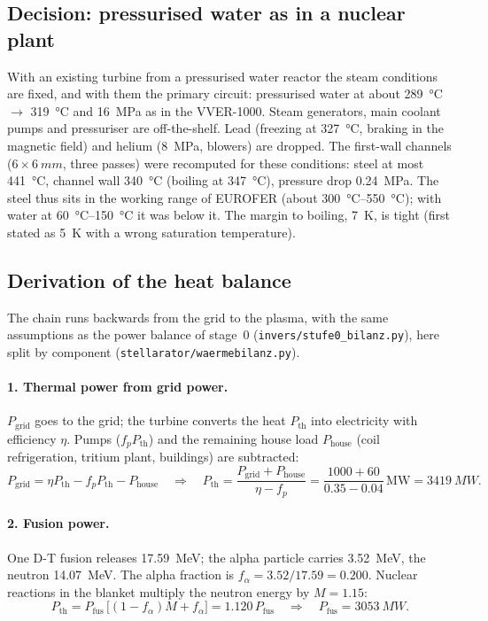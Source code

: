 \documentclass[10pt,a4paper]{article}
\begin{document}
\subsection{Decision: pressurised water as in a nuclear plant}
With an existing turbine from a pressurised water reactor the steam conditions are fixed, and with them the
primary circuit: pressurised water at about \SI{289}{\celsius} $\rightarrow$ \SI{319}{\celsius} and \SI{16}{MPa}
as in the VVER-1000. Steam generators, main coolant pumps and pressuriser are off-the-shelf. Lead (freezing at
\SI{327}{\celsius}, braking in the magnetic field) and helium (\SI{8}{MPa}, blowers) are dropped. The first-wall
channels ($6\times\SI{6}{mm}$, three passes) were recomputed for these conditions: steel at most
\SI{441}{\celsius}, channel wall \SI{340}{\celsius} (boiling at \SI{347}{\celsius}), pressure drop \SI{0.24}{MPa}.
The steel thus sits in the working range of EUROFER (about \SIrange{300}{550}{\celsius}); with water at
\SIrange{60}{150}{\celsius} it was below it. The margin to boiling, \SI{7}{K}, is tight (first stated as \SI{5}{K} with a wrong saturation temperature).

\subsection{Derivation of the heat balance}
The chain runs backwards from the grid to the plasma, with the same assumptions as the power balance of stage~0
(\texttt{invers/stufe0\_bilanz.py}), here split by component (\texttt{stellarator/waermebilanz.py}).

\paragraph{1. Thermal power from grid power.} $P_\text{grid}$ goes to the grid; the turbine converts the heat
$P_\text{th}$ into electricity with efficiency $\eta$. Pumps ($f_p P_\text{th}$) and the remaining house load
$P_\text{house}$ (coil refrigeration, tritium plant, buildings) are subtracted:
\[ P_\text{grid} = \eta P_\text{th} - f_p P_\text{th} - P_\text{house}
   \quad\Rightarrow\quad P_\text{th} = \frac{P_\text{grid} + P_\text{house}}{\eta - f_p}
   = \frac{1000 + 60}{0.35 - 0.04}\,\text{MW} = \SI{3419}{MW}. \]

\paragraph{2. Fusion power.} One D-T fusion releases \SI{17.59}{MeV}; the alpha particle carries \SI{3.52}{MeV},
the neutron \SI{14.07}{MeV}. The alpha fraction is $f_\alpha = 3.52/17.59 = 0.200$. Nuclear reactions in the
blanket multiply the neutron energy by $M = 1.15$:
\[ P_\text{th} = P_\text{fus}\,\bigl[(1-f_\alpha)M + f_\alpha\bigr] = 1.120\,P_\text{fus}
   \quad\Rightarrow\quad P_\text{fus} = \SI{3053}{MW}. \]
\end{document}
